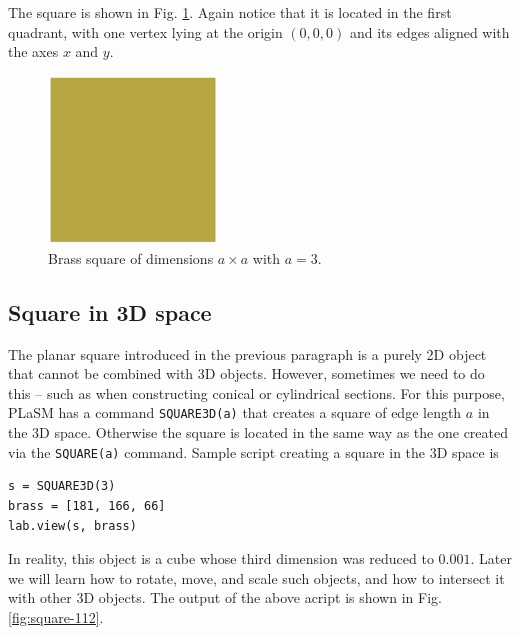 \noindent
The square is shown in Fig. \ref{fig:square-111}. Again notice that 
it is located in the first quadrant, with one vertex lying at 
the origin $(0, 0, 0)$ and its edges aligned with the axes $x$ and $y$.

\begin{figure}[!ht]
\begin{center}
\includegraphics[width=0.4\textwidth]{img/square-111.png}
\end{center}
\vspace{-4mm}
\caption{Brass square of dimensions $a \times a$ with $a = 3$.}
\label{fig:square-111}
\end{figure}
\noindent

\subsection{Square in 3D space}

The planar square introduced in the previous paragraph is a purely 
2D object that cannot be combined with 3D objects. However, sometimes
we need to do this -- such as when constructing conical or cylindrical 
sections. For this purpose, PLaSM has a command {\tt SQUARE3D(a)} that 
creates a square of edge length $a$ in the 3D space. Otherwise the 
square is located in the same way as the one created via the 
{\tt SQUARE(a)} command. Sample script creating a square in the 3D space 
is \\

\begin{bbox}
\begin{verbatim}
s = SQUARE3D(3)
brass = [181, 166, 66]
lab.view(s, brass)
\end{verbatim}
\end{bbox}
\vspace{6mm}

\noindent
In reality, this object is a cube whose third dimension was reduced
to $0.001$. Later we will learn how to rotate, move, and scale such 
objects, and how to intersect it with other 3D objects. The output 
of the above acript is shown in Fig. \ref{fig:square-112}.

